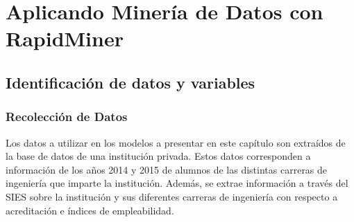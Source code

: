 \chapter[Aplicando Minería de Datos con RapidMiner]{Aplicando Minería de Datos con RapidMiner}
\label{ch:desmin}

\section{Identificación de datos y variables}
\subsection{Recolección de Datos}

Los datos a utilizar en los modelos a presentar en este capítulo son extraídos de la base de datos de una institución privada. Estos datos corresponden a información de los años 2014 y 2015 de alumnos de las distintas carreras de ingeniería que imparte la institución. Además, se extrae información a través del SIES sobre la institución y sus diferentes carreras de ingeniería con respecto a acreditación e índices de empleabilidad.\\

